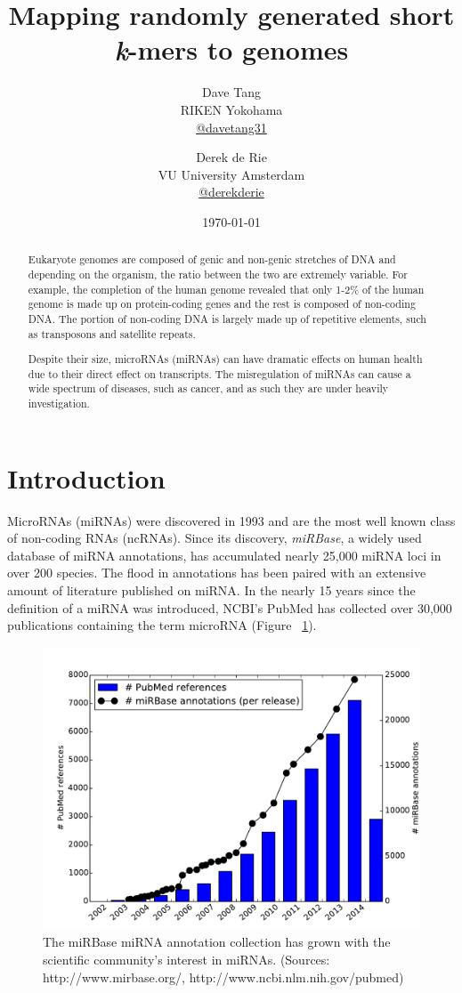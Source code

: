 \documentclass{article}
\title{Mapping randomly generated short \textit{k}-mers to genomes}
\author{Dave Tang  \\
	RIKEN Yokohama \\
        \href{https://twitter.com/davetang31}{@davetang31} \\
	\and 
	Derek de Rie \\
	VU University Amsterdam \\
        \href{https://twitter.com/derekderie}{@derekderie} \\
	}
\date{\today}
\begin{document}
\maketitle

\begin{abstract}

Eukaryote genomes are composed of genic and non-genic stretches of DNA and depending on the organism, the ratio between the two are extremely variable. For example, the completion of the human genome revealed that only 1-2\% of the human genome is made up on protein-coding genes and the rest is composed of non-coding DNA. The portion of non-coding DNA is largely made up of repetitive elements, such as transposons and satellite repeats.

Despite their size, microRNAs (miRNAs) can have dramatic effects on human health due to their direct effect on transcripts. The misregulation of miRNAs can cause a wide spectrum of diseases, such as cancer, and as such they are under heavily investigation.

\end{abstract}

\section{Introduction}
MicroRNAs (miRNAs) were discovered in 1993\cite{pmid8252621} and are the most well known class of non-coding RNAs (ncRNAs). Since its discovery, \emph{miRBase}, a widely used database of miRNA annotations, has accumulated nearly 25,000 miRNA loci in over 200 species. The flood in annotations has been paired with an extensive amount of literature published on miRNA. In the nearly 15 years since the definition of a miRNA was introduced, NCBI's PubMed has collected over 30,000 publications containing the term microRNA (Figure ~\ref{fig:mirna_history}).

\begin{figure}[t]
   \centering
      \includegraphics[width=\textwidth,natwidth=100,natheight=100]{image/mirna_history.pdf}
      \caption{The miRBase miRNA annotation collection has grown with the scientific community's interest in miRNAs. (Sources: http://www.mirbase.org/, http://www.ncbi.nlm.nih.gov/pubmed)}
      \label{fig:mirna_history}
\end{figure}
\end{document}
